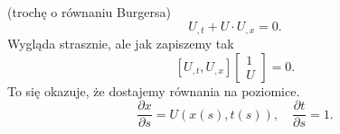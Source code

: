\documentclass[../main.tex]{subfiles}
\begin{document}
\begin{przyklad}
    (trochę o równaniu Burgersa)\\
    \[
        U_{,t} + U \cdot U_{,x} = 0
    .\]
Wygląda strasznie, ale jak zapiszemy tak
\[
    \left[ U_{,t}, U_{,x} \right] \begin{bmatrix} 1\\U \end{bmatrix} = 0
.\]
To się okazuje, że dostajemy równania na poziomice.
\[
    \frac{\partial x}{\partial s} = U\left( x(s), t(s) \right) ,\quad \frac{\partial t}{\partial s} = 1
.\]
\end{przyklad}
\end{document}
